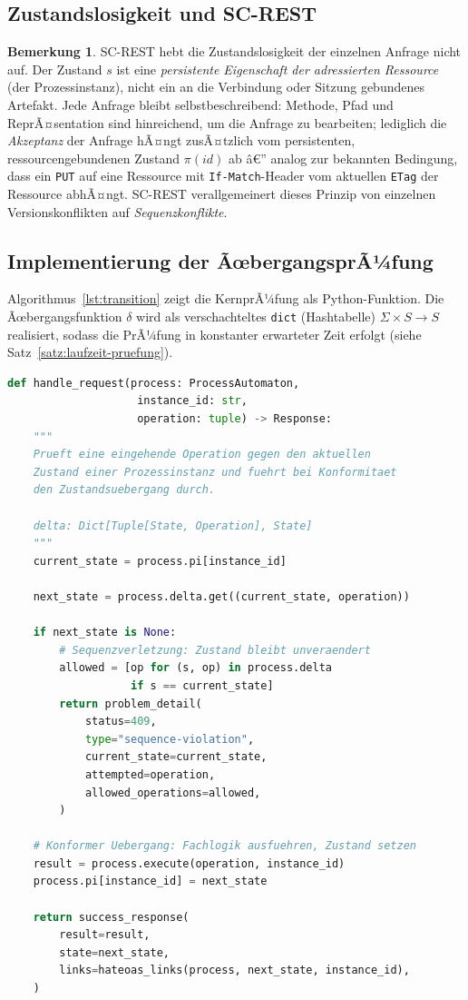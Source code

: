 ﻿\documentclass[a4paper,12pt]{article}
\theoremstyle{definition}
\newtheorem{bemerkung}{Bemerkung}
\begin{document}
\subsection{Zustandslosigkeit und SC-REST}

\begin{bemerkung}
	SC-REST hebt die Zustandslosigkeit der einzelnen Anfrage nicht auf. Der Zustand $s$
	ist eine \emph{persistente Eigenschaft der adressierten Ressource} (der
	Prozessinstanz), nicht ein an die Verbindung oder Sitzung gebundenes Artefakt. Jede
	Anfrage bleibt selbstbeschreibend: Methode, Pfad und ReprÃ¤sentation sind hinreichend,
	um die Anfrage zu bearbeiten; lediglich die \emph{Akzeptanz} der Anfrage hÃ¤ngt
	zusÃ¤tzlich vom persistenten, ressourcengebundenen Zustand $\pi(id)$ ab â€” analog zur
	bekannten Bedingung, dass ein \texttt{PUT} auf eine Ressource mit
	\texttt{If-Match}-Header vom aktuellen \texttt{ETag} der Ressource abhÃ¤ngt. SC-REST
	verallgemeinert dieses Prinzip von einzelnen Versionskonflikten auf
	\emph{Sequenzkonflikte}.
\end{bemerkung}

\subsection{Implementierung der ÃœbergangsprÃ¼fung}

Algorithmus~\ref{lst:transition} zeigt die KernprÃ¼fung als Python-Funktion. Die
Ãœbergangsfunktion $\delta$ wird als verschachteltes \texttt{dict} (Hashtabelle)
$\Sigma \times S \to S$ realisiert, sodass die PrÃ¼fung in konstanter erwarteter Zeit
erfolgt (siehe Satz~\ref{satz:laufzeit-pruefung}).

\begin{lstlisting}[language=Python, label=lst:transition, caption=SC-REST Uebergangspruefung als Middleware-Funktion]
def handle_request(process: ProcessAutomaton,
                    instance_id: str,
                    operation: tuple) -> Response:
    """
    Prueft eine eingehende Operation gegen den aktuellen
    Zustand einer Prozessinstanz und fuehrt bei Konformitaet
    den Zustandsuebergang durch.

    delta: Dict[Tuple[State, Operation], State]
    """
    current_state = process.pi[instance_id]

    next_state = process.delta.get((current_state, operation))

    if next_state is None:
        # Sequenzverletzung: Zustand bleibt unveraendert
        allowed = [op for (s, op) in process.delta
                   if s == current_state]
        return problem_detail(
            status=409,
            type="sequence-violation",
            current_state=current_state,
            attempted=operation,
            allowed_operations=allowed,
        )

    # Konformer Uebergang: Fachlogik ausfuehren, Zustand setzen
    result = process.execute(operation, instance_id)
    process.pi[instance_id] = next_state

    return success_response(
        result=result,
        state=next_state,
        links=hateoas_links(process, next_state, instance_id),
    )
\end{lstlisting}
\end{document}
